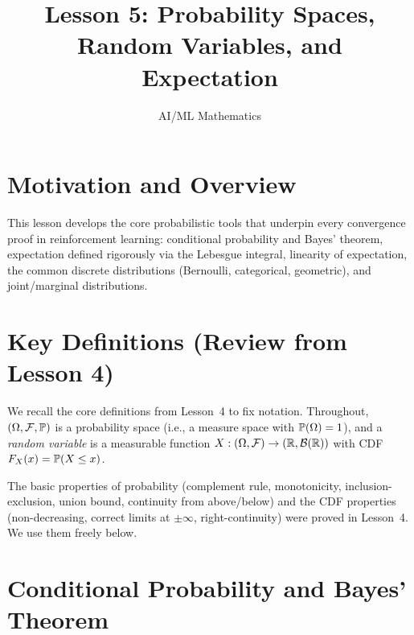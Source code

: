 \documentclass[11pt,a4paper]{article}
\title{Lesson 5: Probability Spaces, Random Variables, and Expectation}
\author{AI/ML Mathematics}
\date{}
\begin{document}
\maketitle
\tableofcontents
\newpage


\section{Motivation and Overview}
\label{sec:motivation}

This lesson develops the core probabilistic tools that underpin every
convergence proof in reinforcement learning: conditional probability and
Bayes' theorem, expectation defined rigorously via the Lebesgue integral,
linearity of expectation, the common discrete distributions (Bernoulli,
categorical, geometric), and joint/marginal distributions.


\section{Key Definitions (Review from Lesson 4)}
\label{sec:review}

We recall the core definitions from Lesson~4 to fix notation.
Throughout, $(\Omega, \mathcal{F}, \mathbb{P})$ is a probability space
(i.e., a measure space with $\mathbb{P}(\Omega) = 1$), and a \emph{random
variable} is a measurable function
$X: (\Omega, \mathcal{F}) \to (\mathbb{R}, \mathcal{B}(\mathbb{R}))$ with CDF
$F_X(x) = \mathbb{P}(X \leq x)$.

The basic properties of probability (complement rule, monotonicity,
inclusion-exclusion, union bound, continuity from above/below) and the
CDF properties (non-decreasing, correct limits at $\pm\infty$,
right-continuity) were proved in Lesson~4. We use them freely below.


\section{Conditional Probability and Bayes' Theorem}
\label{sec:cond_prob}
\end{document}
